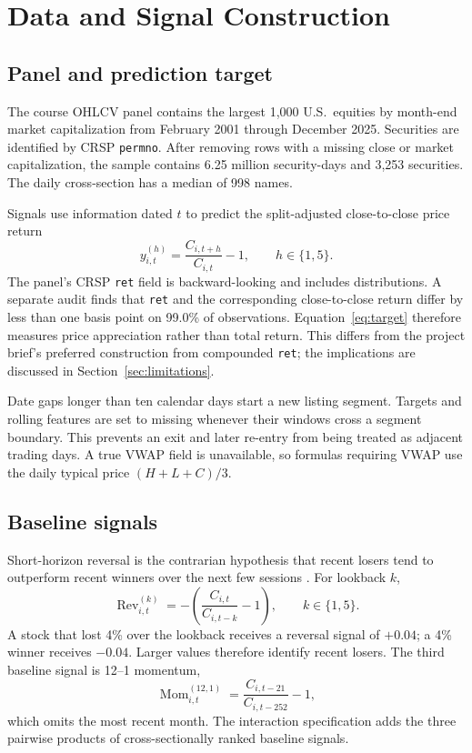 \documentclass[11pt]{article}
\begin{document}
\section{Data and Signal Construction}

\subsection{Panel and prediction target}

The course OHLCV panel contains the largest 1{,}000 U.S.\ equities by
month-end market capitalization from February 2001 through December 2025.
Securities are identified by CRSP \texttt{permno}. After removing rows with a
missing close or market capitalization, the sample contains 6.25 million
security-days and 3{,}253 securities. The daily cross-section has a median of
998 names.

Signals use information dated $t$ to predict the split-adjusted close-to-close
price return
\begin{equation}
 y^{(h)}_{i,t}=\frac{C_{i,t+h}}{C_{i,t}}-1,
 \qquad h\in\{1,5\}.
 \label{eq:target}
\end{equation}
The panel's CRSP \texttt{ret} field is backward-looking and includes
distributions. A separate audit finds that \texttt{ret} and the corresponding
close-to-close return differ by less than one basis point on 99.0\% of
observations. Equation~\eqref{eq:target} therefore measures price
appreciation rather than total return. This differs from the project brief's
preferred construction from compounded \texttt{ret}; the implications are
discussed in Section~\ref{sec:limitations}.

Date gaps longer than ten calendar days start a new listing segment. Targets
and rolling features are set to missing whenever their windows cross a segment
boundary. This prevents an exit and later re-entry from being treated as
adjacent trading days. A true VWAP field is unavailable, so formulas requiring
VWAP use the daily typical price $(H+L+C)/3$.

\subsection{Baseline signals}

Short-horizon reversal is the contrarian hypothesis that recent losers tend
to outperform recent winners over the next few sessions
\cite{jegadeesh,lehmann}. For lookback $k$,
\begin{equation}
 \operatorname{Rev}^{(k)}_{i,t}
 =-\left(\frac{C_{i,t}}{C_{i,t-k}}-1\right),
 \qquad k\in\{1,5\}.
 \label{eq:reversal}
\end{equation}
A stock that lost 4\% over the lookback receives a reversal signal of
$+0.04$; a 4\% winner receives $-0.04$. Larger values therefore identify
recent losers. The third baseline signal is 12--1 momentum,
\begin{equation}
 \operatorname{Mom}^{(12,1)}_{i,t}
 =\frac{C_{i,t-21}}{C_{i,t-252}}-1,
\end{equation}
which omits the most recent month. The interaction specification adds the
three pairwise products of cross-sectionally ranked baseline signals.
\end{document}
